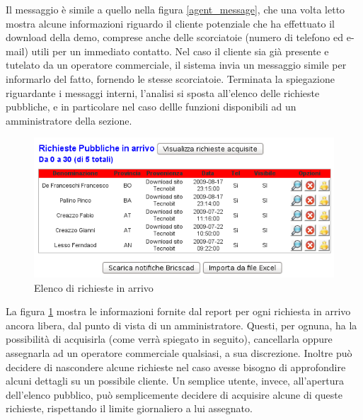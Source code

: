 \noindent
Il messaggio \`e simile a quello nella figura \ref{agent_message}, che una volta letto mostra alcune informazioni riguardo il cliente potenziale che ha effettuato il download della demo, comprese anche delle scorciatoie (numero di telefono ed e-mail) utili per un immediato contatto.
Nel caso il cliente sia gi\`a presente e tutelato da un operatore commerciale, il sistema invia un messaggio simile per informarlo del fatto, fornendo le stesse scorciatoie. 
Terminata la spiegazione riguardante i messaggi interni, l'analisi si sposta all'elenco delle richieste pubbliche, e in particolare nel caso dellle funzioni disponibili ad un amministratore della sezione.
\newpage

\begin{figure}[!ht]
\centering
  \includegraphics[scale=0.6]{./images/elencoRichiesteScreen.png}
\caption{Elenco di richieste in arrivo}
\label{elenco_richieste}
\end{figure}

\noindent
La figura \ref{elenco_richieste} mostra le informazioni fornite dal report per ogni richiesta in arrivo ancora libera, dal punto di vista di un amministratore. Questi, per ognuna, ha la possibilit\`a di acquisirla (come verr\`a spiegato in seguito), cancellarla oppure assegnarla ad un operatore commerciale qualsiasi, a sua discrezione. Inoltre pu\`o decidere di nascondere alcune richieste nel caso avesse bisogno di approfondire alcuni dettagli su un possibile cliente.
Un semplice utente, invece, all'apertura dell'elenco pubblico, pu\`o semplicemente decidere di acquisire alcune di queste richieste, rispettando il limite giornaliero a lui assegnato. 

